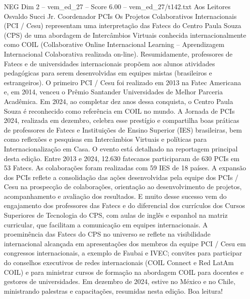 \begin{textsample}{NEG Dim 2 – vem\_ed\_27 – Score 6.00 – vem\_ed\_27/t142.txt}  \label{ex:f2_neg_170}
Aos Leitores Osvaldo Succi Jr.
Coordenador PCIs Os Projetos Colaborativos Internacionais (PCI / Cesu) representam uma interpretação das Fatecs do Centro Paula Souza (CPS) de uma abordagem de Intercâmbios Virtuais conhecida internacionalmente como COIL (Collaborative Online Internacional Learning – Aprendizagem Internacional Colaborativa realizada on-line).
Resumidamente, professores de Fatecs e de universidades internacionais propõem aos alunos atividades pedagógicas para serem desenvolvidas em equipes mistas (brasileiros e estrangeiros).
O primeiro PCI / Cesu foi realizado em 2013 na Fatec Americana e, em 2014, venceu o Prêmio Santander Universidades de Melhor Parceria Acadêmica.
Em 2024, ao completar dez anos dessa conquista, o Centro Paula Souza é reconhecido como referência em COIL no mundo.
A Jornada de PCIs 2024, realizada em dezembro, celebra esse prestígio e compartilha boas práticas de professores de Fatecs e Instituições de Ensino Superior (IES) brasileiras, bem como reflexões e pesquisas em Intercâmbios Virtuais e políticas para Internacionalização em Casa.
O evento está detalhado na reportagem principal desta edição.
Entre 2013 e 2024, 12.630 fatecanos participaram de 630 PCIs em 53 Fatecs.
As colaborações foram realizadas com 59 IES de 18 países.
A expansão dos PCIs reflete a consolidação das ações desenvolvidas pela equipe dos PCIs / Cesu na prospecção de colaborações, orientação ao desenvolvimento de projetos, acompanhamento e avaliação dos resultados.
E muito desse sucesso vem do engajamento dos professores das Fatecs e do diferencial dos currículos dos Cursos Superiores de Tecnologia do CPS, com aulas de inglês e espanhol na matriz curricular, que facilitam a comunicação em equipes internacionais.
A proeminência das Fatecs do CPS no universo se reflete na visibilidade internacional alcançada em apresentações dos membros da equipe PCI / Cesu em congressos internacionais, a exemplo de Faubai e IVEC; convites para participar do conselhos executivos de redes internacionais (COIL Connect e Red LatAm COIL) e para ministrar cursos de formação na abordagem COIL para docentes e gestores de universidades.
Em dezembro de 2024, estive no México e no Chile, ministrando palestras e capacitações, resumidas nesta edição.
Boa leitura!

\end{textsample}
